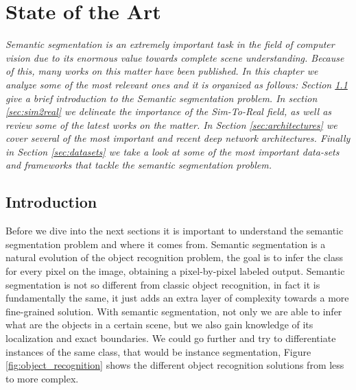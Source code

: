 
\chapter{State of the Art}
\label{marcoteorico}
\textit{Semantic segmentation is an extremely important task in the field of computer vision due to its enormous value towards complete scene understanding. Because of this, many works on this matter have been published. In this chapter we analyze some of the most relevant ones and it is organized as follows: Section \ref{sec:intro} give a brief introduction to the Semantic segmentation problem. In section \ref{sec:sim2real} we delineate the importance of the Sim-To-Real field, as well as review some of the latest works on the matter. In Section \ref{sec:architectures} we cover several of the most important and recent deep network architectures. Finally in Section \ref{sec:datasets} we take a look at some of the most important data-sets and frameworks that tackle the semantic segmentation problem. }

\section{Introduction}
\label{sec:intro}
Before we dive into the next sections it is important to understand the semantic segmentation problem and where it comes from. Semantic segmentation is a natural evolution of the object recognition problem, the goal is to infer the class for every pixel on the image, obtaining a pixel-by-pixel labeled output. 
Semantic segmentation is not so different from classic object recognition, in fact it is fundamentally the same, it just adds an extra layer of complexity towards a more fine-grained solution. With semantic segmentation, not only we are able to infer what are the objects in a certain scene, but we also gain knowledge of its localization and exact boundaries. We could go further and try to differentiate instances of the same class, that would be instance segmentation, Figure \ref{fig:object_recognition} shows the different object recognition solutions from less to more complex.

